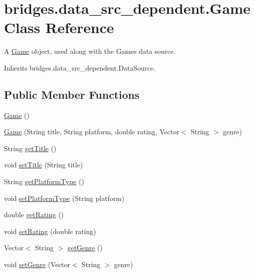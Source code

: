 \hypertarget{classbridges_1_1data__src__dependent_1_1_game}{}\section{bridges.\+data\+\_\+src\+\_\+dependent.\+Game Class Reference}
\label{classbridges_1_1data__src__dependent_1_1_game}


A \hyperlink{classbridges_1_1data__src__dependent_1_1_game}{Game} object, used along with the Games data source.  




Inherits bridges.\+data\+\_\+src\+\_\+dependent.\+Data\+Source.

\subsection*{Public Member Functions}
\begin{DoxyCompactItemize}
\item 
\hyperlink{classbridges_1_1data__src__dependent_1_1_game_a9f145dbcbbfbb0432a2cd8631e57173b}{Game} ()
\item 
\hyperlink{classbridges_1_1data__src__dependent_1_1_game_a2bb9d9f659184be2cc9fc68e38433492}{Game} (String title, String platform, double rating, Vector$<$ String $>$ genre)
\item 
String \hyperlink{classbridges_1_1data__src__dependent_1_1_game_af92a6fdd0e852e6cc5d97fb193be4ca9}{get\+Title} ()
\item 
void \hyperlink{classbridges_1_1data__src__dependent_1_1_game_a0c87151b75bc10357aa6829ebfc0cae3}{set\+Title} (String title)
\item 
String \hyperlink{classbridges_1_1data__src__dependent_1_1_game_a1eef8e419c6302ba83ea595491412494}{get\+Platform\+Type} ()
\item 
void \hyperlink{classbridges_1_1data__src__dependent_1_1_game_ab4d51e07186a9228c50210cf661304c7}{set\+Platform\+Type} (String platform)
\item 
double \hyperlink{classbridges_1_1data__src__dependent_1_1_game_a83b444e2c487701b4e9789a6a35ae210}{get\+Rating} ()
\item 
void \hyperlink{classbridges_1_1data__src__dependent_1_1_game_ab59c6ea5ee2721dcca2246e8e287154f}{set\+Rating} (double rating)
\item 
Vector$<$ String $>$ \hyperlink{classbridges_1_1data__src__dependent_1_1_game_ab3c0e46513e71b56a2970ac014b1bf79}{get\+Genre} ()
\item 
void \hyperlink{classbridges_1_1data__src__dependent_1_1_game_ab3c9d9cd9f0acdd7bdc6ea7e1b140868}{set\+Genre} (Vector$<$ String $>$ genre)
\end{DoxyCompactItemize}


